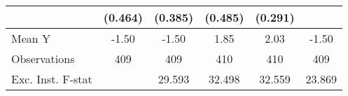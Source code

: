 {\begin{tabular}{l*{5}{c}}
            &     (0.464)         &     (0.385)         &     (0.485)         &     (0.291)         &                     \\
\midrule
Mean Y      &       -1.50         &       -1.50         &        1.85         &        2.03         &       -1.50         \\
Observations&         409         &         409         &         410         &         410         &         409         \\
Exc. Inst. F-stat&                     &      29.593         &      32.498         &      32.559         &      23.869         \\
\bottomrule
\end{tabular}
}
